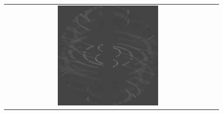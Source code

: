 \documentclass[a4paper,12pt]{article}
\begin{document}
\begin{figure}
\begin{tabular}{cc}
                                                                                                                                                                                                                                                                                                                                                                                                                                                                                                                                                                                                                                                                                                                                                                                                                                 \includegraphics[width=0.5\textwidth]{vismapreafter.pdf} &

\end{tabular}
\end{figure}
\end{document}
